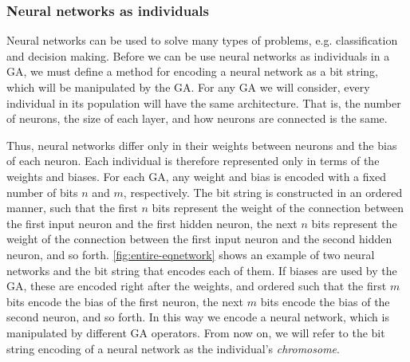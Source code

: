 \subsubsection{Neural networks as individuals}

Neural networks can be used to solve many types of problems, e.g. classification and decision making.
Before we can be use neural networks as individuals in a GA, we must define a method for encoding a neural network as a bit string, which will be manipulated by the GA. For any GA we will consider, every individual in its population will have the same architecture. That is, the number of neurons, the size of each layer, and how neurons are connected is the same.


Thus, neural networks differ only in their weights between neurons and the bias of each neuron.
Each individual is therefore represented only in terms of the weights and biases.
For each GA, any weight and bias is encoded with a fixed number of bits $n$ and $m$, respectively.
The bit string is constructed in an ordered manner, such that the first $n$ bits represent the weight of the connection between the first input neuron and the first hidden neuron, the next $n$ bits represent the weight of the connection between the first input neuron and the second hidden neuron, and so forth. \cref{fig:entire-eqnetwork} shows an example of two neural networks and the bit string that encodes each of them.
If biases are used by the GA, these are encoded right after the weights, and ordered such that the first $m$ bits encode the bias of the first neuron, the next $m$ bits encode the bias of the second neuron, and so forth.
In this way we encode a neural network, which is manipulated by different GA operators.
From now on, we will refer to the bit string encoding of a neural network as the individual's \emph{chromosome}.


